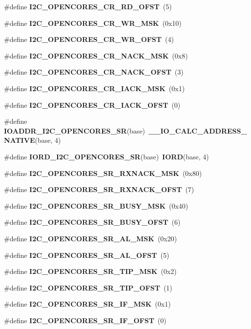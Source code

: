 \begin{DoxyCompactItemize}
\#define {\bf I2\+C\+\_\+\+O\+P\+E\+N\+C\+O\+R\+E\+S\+\_\+\+C\+R\+\_\+\+R\+D\+\_\+\+O\+F\+ST}~(5)
\item 
\#define {\bf I2\+C\+\_\+\+O\+P\+E\+N\+C\+O\+R\+E\+S\+\_\+\+C\+R\+\_\+\+W\+R\+\_\+\+M\+SK}~(0x10)
\item 
\#define {\bf I2\+C\+\_\+\+O\+P\+E\+N\+C\+O\+R\+E\+S\+\_\+\+C\+R\+\_\+\+W\+R\+\_\+\+O\+F\+ST}~(4)
\item 
\#define {\bf I2\+C\+\_\+\+O\+P\+E\+N\+C\+O\+R\+E\+S\+\_\+\+C\+R\+\_\+\+N\+A\+C\+K\+\_\+\+M\+SK}~(0x8)
\item 
\#define {\bf I2\+C\+\_\+\+O\+P\+E\+N\+C\+O\+R\+E\+S\+\_\+\+C\+R\+\_\+\+N\+A\+C\+K\+\_\+\+O\+F\+ST}~(3)
\item 
\#define {\bf I2\+C\+\_\+\+O\+P\+E\+N\+C\+O\+R\+E\+S\+\_\+\+C\+R\+\_\+\+I\+A\+C\+K\+\_\+\+M\+SK}~(0x1)
\item 
\#define {\bf I2\+C\+\_\+\+O\+P\+E\+N\+C\+O\+R\+E\+S\+\_\+\+C\+R\+\_\+\+I\+A\+C\+K\+\_\+\+O\+F\+ST}~(0)
\item 
\#define {\bf I\+O\+A\+D\+D\+R\+\_\+\+I2\+C\+\_\+\+O\+P\+E\+N\+C\+O\+R\+E\+S\+\_\+\+SR}(base)~{\bf \+\_\+\+\_\+\+I\+O\+\_\+\+C\+A\+L\+C\+\_\+\+A\+D\+D\+R\+E\+S\+S\+\_\+\+N\+A\+T\+I\+VE}(base, 4)
\item 
\#define {\bf I\+O\+R\+D\+\_\+\+I2\+C\+\_\+\+O\+P\+E\+N\+C\+O\+R\+E\+S\+\_\+\+SR}(base)~{\bf I\+O\+RD}(base, 4)
\item 
\#define {\bf I2\+C\+\_\+\+O\+P\+E\+N\+C\+O\+R\+E\+S\+\_\+\+S\+R\+\_\+\+R\+X\+N\+A\+C\+K\+\_\+\+M\+SK}~(0x80)
\item 
\#define {\bf I2\+C\+\_\+\+O\+P\+E\+N\+C\+O\+R\+E\+S\+\_\+\+S\+R\+\_\+\+R\+X\+N\+A\+C\+K\+\_\+\+O\+F\+ST}~(7)
\item 
\#define {\bf I2\+C\+\_\+\+O\+P\+E\+N\+C\+O\+R\+E\+S\+\_\+\+S\+R\+\_\+\+B\+U\+S\+Y\+\_\+\+M\+SK}~(0x40)
\item 
\#define {\bf I2\+C\+\_\+\+O\+P\+E\+N\+C\+O\+R\+E\+S\+\_\+\+S\+R\+\_\+\+B\+U\+S\+Y\+\_\+\+O\+F\+ST}~(6)
\item 
\#define {\bf I2\+C\+\_\+\+O\+P\+E\+N\+C\+O\+R\+E\+S\+\_\+\+S\+R\+\_\+\+A\+L\+\_\+\+M\+SK}~(0x20)
\item 
\#define {\bf I2\+C\+\_\+\+O\+P\+E\+N\+C\+O\+R\+E\+S\+\_\+\+S\+R\+\_\+\+A\+L\+\_\+\+O\+F\+ST}~(5)
\item 
\#define {\bf I2\+C\+\_\+\+O\+P\+E\+N\+C\+O\+R\+E\+S\+\_\+\+S\+R\+\_\+\+T\+I\+P\+\_\+\+M\+SK}~(0x2)
\item 
\#define {\bf I2\+C\+\_\+\+O\+P\+E\+N\+C\+O\+R\+E\+S\+\_\+\+S\+R\+\_\+\+T\+I\+P\+\_\+\+O\+F\+ST}~(1)
\item 
\#define {\bf I2\+C\+\_\+\+O\+P\+E\+N\+C\+O\+R\+E\+S\+\_\+\+S\+R\+\_\+\+I\+F\+\_\+\+M\+SK}~(0x1)
\item 
\#define {\bf I2\+C\+\_\+\+O\+P\+E\+N\+C\+O\+R\+E\+S\+\_\+\+S\+R\+\_\+\+I\+F\+\_\+\+O\+F\+ST}~(0)
\end{DoxyCompactItemize}


